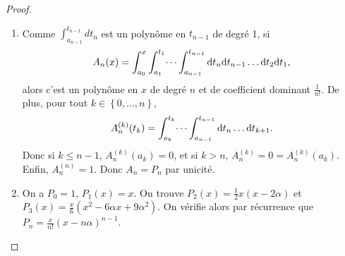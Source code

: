 \documentclass[12pt]{article}
\begin{document}
\begin{proof}
\begin{enumerate}
		\item Comme $\int_{a_{n-1}}^{t_{n-1}}d t_{n}$ est un polynôme en $t_{n-1}$ de degré 1, si 
		\begin{equation}
			A_n(x)=\int_{a_{0}}^{x}\int_{a_1}^{t_1}\dots\int_{a_{n-1}}^{t_{n-1}}\mathrm{d} t_{n}\mathrm{d} t_{n-1}\dots\mathrm{d} t_{2}\mathrm{d} t_{1},
		\end{equation}
		alors c'est un polynôme en $x$ de degré $n$ et de coefficient dominant $\frac{1}{n!}$. De plus, pour tout $k\in\left\lbrace0,\dots,n\right\rbrace$,
		\begin{equation}
			A_n^{(k)}(t_k)=\int_{a_k}^{t_k}\dots\int_{a_{n-1}}^{t_{n-1}}\mathrm{d} t_{n}\dots\mathrm{d} t_{k+1}.
		\end{equation}
		Donc si $k\leqslant n-1$, $A_n^{(k)}(a_k)=0$, et si $k>n$, $A_{n}^{(k)}=0=A_n^{(k)}(a_k)$. Enfin, $A_n^{(n)}=1$. Donc $A_n=P_n$ par unicité.

		\item On a $P_0=1$, $P_1(x)=x$. On trouve $P_2(x)=\frac{1}{2}x(x-2\alpha)$ et $P_3(x)=\frac{x}{6}\left(x^{2}-6\alpha x+9\alpha^{2}\right)$. On vérifie alors par récurrence que $P_n=\frac{x}{n!}\left(x-n\alpha\right)^{n-1}$.
	\end{enumerate}
\end{proof}
\end{document}
